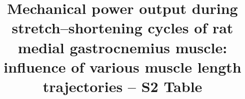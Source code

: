 \documentclass[
  11pt,
  a4paper]{article}
\title{Mechanical power output during stretch--shortening cycles of rat
medial gastrocnemius muscle: influence of various muscle length
trajectories -- S2 Table}
\author{}
\date{}
\begin{document}
\linenumbers

\setcounter{supptbl}{1}

\renewcommand{\thesection}{S\arabic{section}}
\setcounter{section}{1}

\begin{supptbl}[H]

\caption{\label{supptbl-sscpa}SSC parameters, stimulation durations, and
measured AMPO of experimental stretch-shortening cycles with a 8 mm MTC
length excursion. Stimulation onset was set at the start of MTC
shortening in all conditions.}

\centering{

\centering


}

\end{supptbl}%
\end{document}

